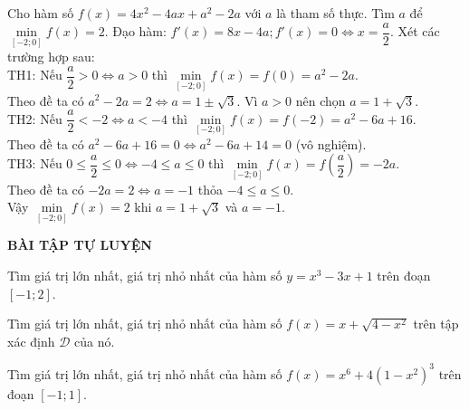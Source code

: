 \begin{vd}%
	Cho hàm số $f(x)=4x^2-4ax+a^2-2a$ với $a$ là tham số thực. Tìm $a$ để $\min\limits_{[-2;0]}f(x)=2$.
	\loigiai
	{Đạo hàm: $f'(x)=8x-4a; f'(x)=0\Leftrightarrow x=\dfrac{a}{2}$. Xét các trường hợp sau:\\TH1: Nếu $\dfrac{a}{2}>0\Leftrightarrow a>0$ thì $\min\limits_{[-2;0]}f(x)=f(0)=a^2-2a$.\\Theo đề ta có $a^2-2a=2\Leftrightarrow a=1\pm\sqrt{3}$. Vì $a>0$ nên chọn $a=1+\sqrt{3}$.\\TH2: Nếu $\dfrac{a}{2}<-2\Leftrightarrow a<-4$ thì $\min\limits_{[-2;0]}f(x)=f(-2)=a^2-6a+16$.\\Theo đề ta có $a^2-6a+16=0\Leftrightarrow a^2-6a+14=0$ (vô nghiệm).\\TH3: Nếu $0\leq\dfrac{a}{2}\leq 0\Leftrightarrow -4\leq a\leq 0$ thì $\min\limits_{[-2;0]}f(x)=f\left(\dfrac{a}{2}\right)=-2a$.\\Theo đề ta có $-2a=2\Leftrightarrow a=-1$ thỏa $-4\leq a\leq 0$.\\Vậy $\min\limits_{[-2;0]}f(x)=2$ khi $a=1+\sqrt{3}$ và $a=-1$.}
\end{vd}
\begin{center}
	\textbf{BÀI TẬP TỰ LUYỆN}
\end{center}
\begin{bt}%
	Tìm giá trị lớn nhất, giá trị nhỏ nhất của hàm số $y=x^3-3x+1$ trên đoạn $[-1;2]$.
\end{bt}
\begin{bt}%
	Tìm giá trị lớn nhất, giá trị nhỏ nhất của hàm số $f(x)=x+\sqrt{4-x^2}$ trên tập xác định $\mathscr{D}$ của nó.
\end{bt}

\begin{bt}%
	Tìm giá trị lớn nhất, giá trị nhỏ nhất của hàm số $f(x)=x^6+4\left(1-x^2\right)^3$ trên đoạn $[-1;1]$.
\end{bt}

